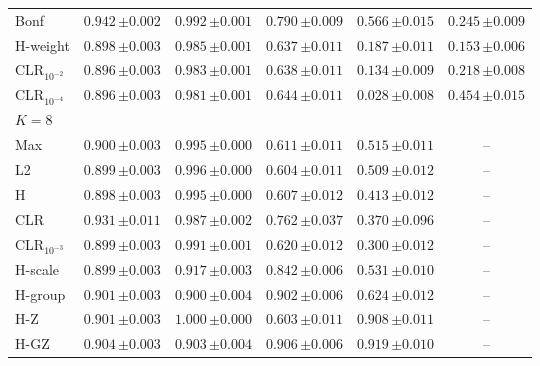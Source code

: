 \begin{tabular}{lccccc}
Bonf & $0.942\,{\scriptstyle\pm 0.002}$ & $0.992\,{\scriptstyle\pm 0.001}$ & $0.790\,{\scriptstyle\pm 0.009}$ & $0.566\,{\scriptstyle\pm 0.015}$ & $0.245\,{\scriptstyle\pm 0.009}$ \\
H-weight & $0.898\,{\scriptstyle\pm 0.003}$ & $0.985\,{\scriptstyle\pm 0.001}$ & $0.637\,{\scriptstyle\pm 0.011}$ & $0.187\,{\scriptstyle\pm 0.011}$ & $0.153\,{\scriptstyle\pm 0.006}$ \\
CLR$_{10^{-2}}$ & $0.896\,{\scriptstyle\pm 0.003}$ & $0.983\,{\scriptstyle\pm 0.001}$ & $0.638\,{\scriptstyle\pm 0.011}$ & $0.134\,{\scriptstyle\pm 0.009}$ & $0.218\,{\scriptstyle\pm 0.008}$ \\
CLR$_{10^{-4}}$ & $0.896\,{\scriptstyle\pm 0.003}$ & $0.981\,{\scriptstyle\pm 0.001}$ & $0.644\,{\scriptstyle\pm 0.011}$ & $0.028\,{\scriptstyle\pm 0.008}$ & $0.454\,{\scriptstyle\pm 0.015}$ \\
\midrule
\multicolumn{6}{l}{$K=8$} \\
Max & $0.900\,{\scriptstyle\pm 0.003}$ & $0.995\,{\scriptstyle\pm 0.000}$ & $0.611\,{\scriptstyle\pm 0.011}$ & $0.515\,{\scriptstyle\pm 0.011}$ & -- \\
L2 & $0.899\,{\scriptstyle\pm 0.003}$ & $0.996\,{\scriptstyle\pm 0.000}$ & $0.604\,{\scriptstyle\pm 0.011}$ & $0.509\,{\scriptstyle\pm 0.012}$ & -- \\
H & $0.898\,{\scriptstyle\pm 0.003}$ & $0.995\,{\scriptstyle\pm 0.000}$ & $0.607\,{\scriptstyle\pm 0.012}$ & $0.413\,{\scriptstyle\pm 0.012}$ & -- \\
CLR & $0.931\,{\scriptstyle\pm 0.011}$ & $0.987\,{\scriptstyle\pm 0.002}$ & $0.762\,{\scriptstyle\pm 0.037}$ & $0.370\,{\scriptstyle\pm 0.096}$ & -- \\
CLR$_{10^{-3}}$ & $0.899\,{\scriptstyle\pm 0.003}$ & $0.991\,{\scriptstyle\pm 0.001}$ & $0.620\,{\scriptstyle\pm 0.012}$ & $0.300\,{\scriptstyle\pm 0.012}$ & -- \\
H-scale & $0.899\,{\scriptstyle\pm 0.003}$ & $0.917\,{\scriptstyle\pm 0.003}$ & $0.842\,{\scriptstyle\pm 0.006}$ & $0.531\,{\scriptstyle\pm 0.010}$ & -- \\
H-group & $0.901\,{\scriptstyle\pm 0.003}$ & $0.900\,{\scriptstyle\pm 0.004}$ & $0.902\,{\scriptstyle\pm 0.006}$ & $0.624\,{\scriptstyle\pm 0.012}$ & -- \\
H-Z & $0.901\,{\scriptstyle\pm 0.003}$ & $1.000\,{\scriptstyle\pm 0.000}$ & $0.603\,{\scriptstyle\pm 0.011}$ & $0.908\,{\scriptstyle\pm 0.011}$ & -- \\
H-GZ & $0.904\,{\scriptstyle\pm 0.003}$ & $0.903\,{\scriptstyle\pm 0.004}$ & $0.906\,{\scriptstyle\pm 0.006}$ & $0.919\,{\scriptstyle\pm 0.010}$ & -- \\

\end{tabular}
